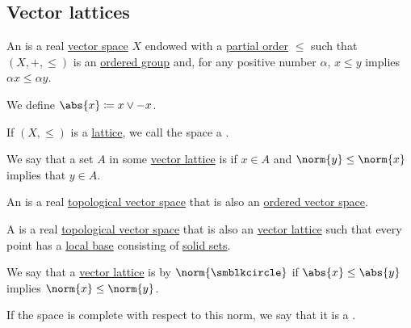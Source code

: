 \subsection{Vector lattices}\label{subsec:vector_lattices}

\begin{definition}\label{def:ordered_vector_space}
  An  is a real \hyperref[def:vector_space]{vector space} \( X \) endowed with a \hyperref[def:partially_ordered_set]{partial order} \( \leq \) such that \( (X, +, \leq) \) is an \hyperref[def:ordered_magma]{ordered group} and, for any positive number \( \alpha \), \( x \leq y \) implies \( \alpha x \leq \alpha y \).

  We define \( \abs{x} \coloneqq x \vee -x \).

  If \( (X, \leq) \) is a \hyperref[def:lattice]{lattice}, we call the space a .
\end{definition}

\begin{definition}\label{def:solid_set}
  We say that a set \( A \) in some \hyperref[def:ordered_vector_space]{vector lattice} is  if \( x \in A \) and \( \norm{y} \leq \norm{x} \) implies that \( y \in A \).
\end{definition}

\begin{definition}\label{def:ordered_topological_vector_space}
  An  is a real \hyperref[def:topological_vector_space]{topological vector space} that is also an \hyperref[def:ordered_vector_space]{ordered vector space}.
\end{definition}

\begin{definition}\label{def:topological_vector_lattice}
  A  is a real \hyperref[def:topological_vector_space]{topological vector space} that is also an \hyperref[def:ordered_vector_space]{vector lattice} such that every point has a \hyperref[def:topological_local_base]{local base} consisting of \hyperref[def:solid_set]{solid sets}.
\end{definition}

\begin{definition}\label{def:normed_vector_lattice}
  We say that a \hyperref[def:ordered_vector_space]{vector lattice} is  by \( \norm{\anon} \) if \( \abs{x} \leq \abs{y} \) implies \( \norm{x} \leq \norm{y} \).

  If the space is complete with respect to this norm, we say that it is a .
\end{definition}
